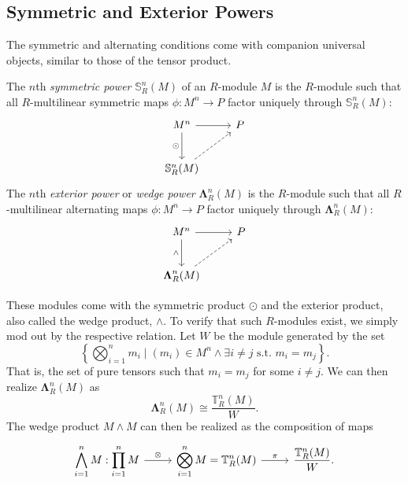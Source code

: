\subsection{Symmetric and Exterior Powers}
The symmetric and alternating conditions come with companion universal objects, similar to those of the tensor product.
\begin{definition}\label{dfn:8.15}
	The $n$th \emph{symmetric power} $\mathbb{S}_R^n(M)$ of an $R$-module $M$ is the $R$-module such that all $R$-multilinear symmetric maps $\phi : M^{n}  \to P$ factor uniquely through $\mathbb{S} _R^n(M)$:
	\[\begin{tikzcd}[row sep = 2.5em, column sep = 2.5em]
		M^n\arrow[r]\arrow[d, "\odot"']&P\\
		\mathbb{S}_R^n(M)\arrow[ur,dashed]
	\end{tikzcd}\]
	The $n$th \emph{exterior power} or \emph{wedge power} $\boldsymbol{\Lambda} _R^n\left(M \right) $ is the $R$-module such that all $R$-multilinear alternating maps $\phi : M^n \to P$ factor uniquely through $\boldsymbol{\Lambda} _R^n\left(M \right) $:
	\[\begin{tikzcd}[row sep = 2.5em, column sep = 2.5em]
		M^n\arrow[r]\arrow[d, "\wedge"']&P\\
		\boldsymbol{\Lambda} _R^n(M)\arrow[ur, dashed]
	\end{tikzcd}\]
\end{definition}
These modules come with the symmetric product $\odot$ and the exterior product, also called the wedge product, $\wedge$. To verify that such $R$-modules exist, we simply mod out by the respective relation. Let $W$ be the module generated by the set
\[
	\left\{ \bigotimes_{i=1}^n m_i \mid (m_i)\in M^{n} \land \exists i\neq j \text{ s.t. } m_i=m_j \right\} 
.\]
That is, the set of pure tensors such that $m_i=m_j$ for some $i\neq j$. We can then realize $\boldsymbol{\Lambda }_R^n(M)$ as
\[
	\boldsymbol{\Lambda}_R^n(M)\cong \frac{\mathbb{T} _R^n(M)}{W} 
.\]
The wedge product $M\wedge M$ can then be realized as the composition of maps
\[\begin{tikzcd}[row sep = 2.5em, column sep = 2.5em]
	\displaystyle{\bigwedge_{i=1}^n M}:\displaystyle{\prod_{i=1}^{n} M}\arrow[r, "\otimes "]&\displaystyle{\bigotimes_{i=1}^n M=\mathbb{T}_{R}^n(M)}\arrow[r, "\pi "]&\displaystyle{\frac{\mathbb{T} _R^n(M)}{W} }.
\end{tikzcd}\]

